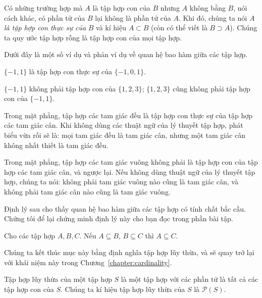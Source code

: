 Có những trường hợp mà $A$ là tập hợp con của $B$ nhưng $A$ không bằng $B$, nói cách khác, có phần tử của $B$ lại không là phần tử của $A$. Khi đó, chúng ta nói $A$ \textit{là tập hợp con thực sự của} $B$ và kí hiệu $A\subset B$ (còn có thể viết là $B\supset A$). Chúng ta quy ước tập hợp rỗng là tập hợp con của mọi tập hợp.

Dưới đây là một số ví dụ và phản ví dụ về quan hệ bao hàm giữa các tập hợp.

\begin{example}
    $\{ -1, 1 \}$ là tập hợp con thực sự của $\{ -1, 0, 1 \}$.
\end{example}

\begin{counterexample}
    $\{ -1, 1 \}$ không phải tập hợp con của $\{ 1, 2, 3 \}$; $\{ 1, 2, 3 \}$ cũng không phải tập hợp con của $\{ -1, 1 \}$.
\end{counterexample}

\begin{example}
    Trong mặt phẳng, tập hợp các tam giác đều là tập hợp con thực sự của tập hợp các tam giác cân. Khi không dùng các thuật ngữ của lý thuyết tập hợp, phát biểu vừa rồi sẽ là: mọi tam giác đều là tam giác cân, nhưng một tam giác cân không nhất thiết là tam giác đều.
\end{example}

\begin{counterexample}
    Trong mặt phẳng, tập hợp các tam giác vuông không phải là tập hợp con của tập hợp các tam giác cân, và ngược lại. Nếu không dùng thuật ngữ của lý thuyết tập hợp, chúng ta nói: không phải tam giác vuông nào cũng là tam giác cân, và không phải tam giác cân nào cũng là tam giác vuông.
\end{counterexample}

Định lý sau cho thấy quan hệ bao hàm giữa các tập hợp có tính chất bắc cầu. Chứng tôi để lại chứng minh định lý này cho bạn đọc trong phần bài tập.

\begin{theorem}
    Cho các tập hợp $A, B, C$. Nếu $A\subseteq B$, $B\subseteq C$ thì $A\subseteq C$.
\end{theorem}

Chúng ta kết thúc mục này bằng định nghĩa tập hợp lũy thừa, và sẽ quay trở lại với khái niệm này trong Chương~\ref{chapter:cardinality}.

\begin{definition}
    Tập hợp lũy thừa của một tập hợp $S$ là một tập hợp với các phần tử là tất cả các tập hợp con của $S$. Chúng ta kí hiệu tập hợp lũy thừa của $S$ là $\mathcal{P}(S)$.
\end{definition}

